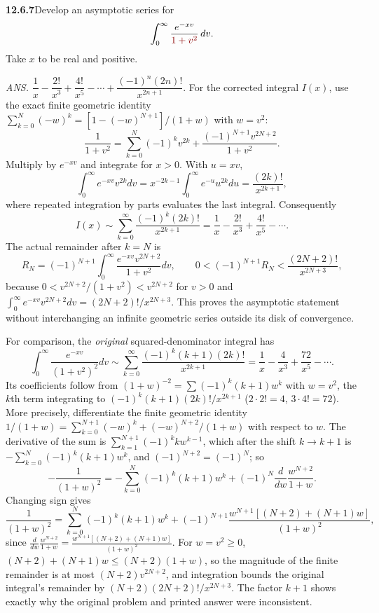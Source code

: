 \par\bigskip
\noindent\textbf{12.6.7}\quad Develop an asymptotic series for
\[
\int_{0}^{\infty}\frac{e^{-xv}}{\erratum{1+v^{2}}}\,dv.
\]
Take $x$ to be real and positive.
\par\nobreak\hfill\emph{ANS.}\enspace
$\dfrac{1}{x}-\dfrac{2!}{x^{3}}+\dfrac{4!}{x^{5}}-\cdots
+\dfrac{(-1)^{n}(2n)!}{x^{2n+1}}$.
\solution
{}
For the corrected integral $I(x)$, use the exact finite geometric
identity $\sum_{k=0}^N(-w)^k=[1-(-w)^{N+1}]/(1+w)$ with $w=v^2$:
\[
\frac1{1+v^2}=\sum_{k=0}^N(-1)^kv^{2k}
+\frac{(-1)^{N+1}v^{2N+2}}{1+v^2}.
\]
Multiply by $e^{-xv}$ and integrate for $x>0$. With $u=xv$,
\[
\int_0^\infty e^{-xv}v^{2k}dv
=x^{-2k-1}\int_0^\infty e^{-u}u^{2k}du
=\frac{(2k)!}{x^{2k+1}},
\]
where repeated integration by parts evaluates the last integral.
Consequently
\[
\boxed{I(x)\sim\sum_{k=0}^{\infty}\frac{(-1)^k(2k)!}{x^{2k+1}}
=\frac1x-\frac{2!}{x^3}+\frac{4!}{x^5}-\cdots}.
\]
The actual remainder after $k=N$ is
\[
R_N=(-1)^{N+1}\int_0^\infty
 \frac{e^{-xv}v^{2N+2}}{1+v^2}dv,\qquad
0<(-1)^{N+1}R_N<\frac{(2N+2)!}{x^{2N+3}},
\]
because $0<v^{2N+2}/(1+v^2)<v^{2N+2}$ for $v>0$ and
$\int_0^\infty e^{-xv}v^{2N+2}dv=(2N+2)!/x^{2N+3}$.
This proves the asymptotic statement without interchanging an infinite
geometric series outside its disk of convergence.

For comparison, the \emph{original} squared-denominator integral has
\[
\int_0^\infty\frac{e^{-xv}}{(1+v^2)^2}dv
\sim\boxed{\sum_{k=0}^{\infty}
\frac{(-1)^k(k+1)(2k)!}{x^{2k+1}}}
=\frac1x-\frac{4}{x^3}+\frac{72}{x^5}-\cdots.
\]
Its coefficients follow from $(1+w)^{-2}=\sum(-1)^k(k+1)w^k$ with
$w=v^2$, the $k$th term integrating to $(-1)^k(k+1)(2k)!/x^{2k+1}$
($2\cdot2!=4$, $3\cdot4!=72$).
More precisely, differentiate the finite geometric identity
$1/(1+w)=\sum_{k=0}^{N+1}(-w)^k+(-w)^{N+2}/(1+w)$ with respect to $w$.
The derivative of the sum is $\sum_{k=1}^{N+1}(-1)^kkw^{k-1}$, which after the shift
$k\to k+1$ is $-\sum_{k=0}^N(-1)^k(k+1)w^k$, and $(-1)^{N+2}=(-1)^N$;
so
\[
-\frac1{(1+w)^2}=-\sum_{k=0}^N(-1)^k(k+1)w^k
+(-1)^N\frac d{dw}\frac{w^{N+2}}{1+w}.
\]
Changing sign gives
\[
\frac1{(1+w)^2}=\sum_{k=0}^N(-1)^k(k+1)w^k
+(-1)^{N+1}\frac{w^{N+1}[(N+2)+(N+1)w]}{(1+w)^2},
\]
since
$\frac d{dw}\frac{w^{N+2}}{1+w}=\frac{w^{N+1}[(N+2)+(N+1)w]}{(1+w)^2}$.
For $w=v^2\ge0$, $(N+2)+(N+1)w\le(N+2)(1+w)$, so the magnitude of the
finite remainder is at most $(N+2)v^{2N+2}$,
and integration bounds the original integral's remainder by
$(N+2)(2N+2)!/x^{2N+3}$. The factor $k+1$ shows exactly why the
original problem and printed answer were inconsistent.

